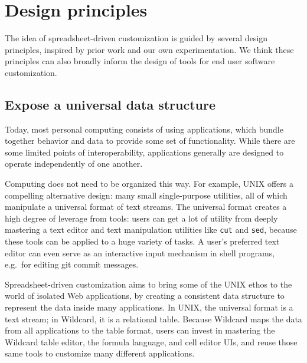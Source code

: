 \documentclass[english,submission]{programming}
\begin{document}
\hypertarget{sec:design-principles}{%
\section{Design principles}\label{sec:design-principles}}

The idea of spreadsheet-driven customization is guided by several design
principles, inspired by prior work and our own experimentation. We think
these principles can also broadly inform the design of tools for end
user software customization.

\hypertarget{expose-a-universal-data-structure}{%
\subsection{Expose a universal data
structure}\label{expose-a-universal-data-structure}}

Today, most personal computing consists of using applications, which
bundle together behavior and data to provide some set of functionality.
While there are some limited points of interoperability, applications
generally are designed to operate independently of one another.

Computing does not need to be organized this way. For example, UNIX
offers a compelling alternative design: many small single-purpose
utilities, all of which manipulate a universal format of text streams.
The universal format creates a high degree of leverage from tools: users
can get a lot of utility from deeply mastering a text editor and text
manipulation utilities like \texttt{cut} and \texttt{sed}, because these
tools can be applied to a huge variety of tasks. A user's preferred text
editor can even serve as an interactive input mechanism in shell
programs, e.g.~for editing git commit messages.

Spreadsheet-driven customization aims to bring some of the UNIX ethos to
the world of isolated Web applications, by creating a consistent data
structure to represent the data inside many applications. In UNIX, the
universal format is a text stream; in Wildcard, it is a relational
table. Because Wildcard maps the data from all applications to the table
format, users can invest in mastering the Wildcard table editor, the
formula language, and cell editor UIs, and reuse those same tools to
customize many different applications.
\end{document}
